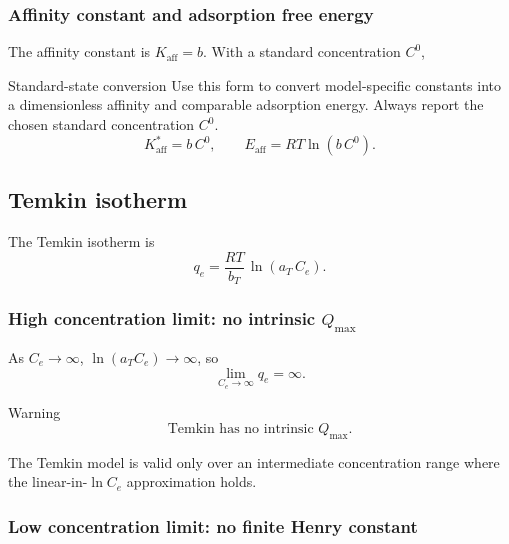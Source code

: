 \documentclass[journal=jacsat,manuscript=article]{achemso}
\begin{document}
\subsubsection{Affinity constant and adsorption free energy}

The affinity constant is $K_{\mathrm{aff}} = b$. With a standard concentration $C^0$,
\begin{greenbox}{Standard-state conversion}
	Use this form to convert model-specific constants into a dimensionless affinity and comparable adsorption energy. Always report the chosen standard concentration \(C^0\).
\begin{equation}
	K_{\mathrm{aff}}^{\ast} = b\, C^0,
		\qquad
		E_{\mathrm{aff}} = RT\ln(b\, C^0).
\end{equation}
\end{greenbox}

\subsection{Temkin isotherm}
\label{sec:si_temkin}

The Temkin isotherm is
\begin{equation}
	q_e = \frac{RT}{b_T}\,\ln(a_T\, C_e).
	\label{eq:si_temkin}
\end{equation}

\subsubsection{High concentration limit: no intrinsic $Q_{\max}$}

As $C_e \to \infty$, $\ln(a_T C_e) \to \infty$, so
\begin{equation}
	\lim_{C_e \to \infty} q_e = \infty.
\end{equation}

\begin{redbox}{Warning}
	\begin{equation}
		\text{Temkin has no intrinsic } Q_{\max}.
	\end{equation}
\end{redbox}

The Temkin model is valid only over an intermediate concentration range where the linear-in-$\ln C_e$ approximation holds.

\subsubsection{Low concentration limit: no finite Henry constant}
\end{document}
